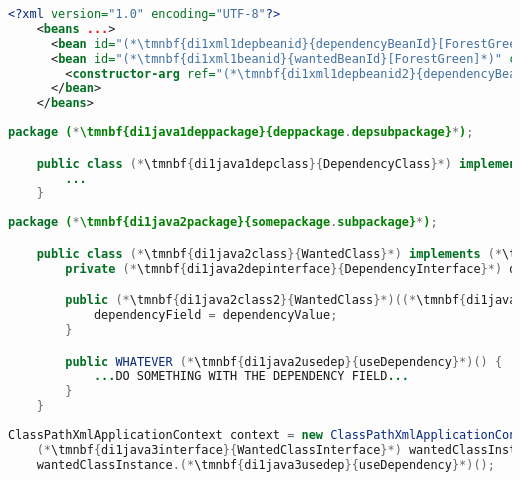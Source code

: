 \begin{lstlisting}[language=XML, title={Configuration XML}]
    <?xml version="1.0" encoding="UTF-8"?>
    <beans ...>
      <bean id="(*\tmnbf{di1xml1depbeanid}{dependencyBeanId}[ForestGreen]*)" class="(*\tmnbf{di1xml1deppackage}{deppackage.depsubpackage}[ForestGreen]*).(*\tmnbf{di1xml1depclass}{DependencyClass}[ForestGreen]*)"/>
      <bean id="(*\tmnbf{di1xml1beanid}{wantedBeanId}[ForestGreen]*)" class="(*\tmnbf{di1xml1package}{somepackage.subpackage}[ForestGreen]*).(*\tmnbf{di1xml1class}{WantedClass}[ForestGreen]*)">
        <constructor-arg ref="(*\tmnbf{di1xml1depbeanid2}{dependencyBeanId}[ForestGreen]*)"/>
      </bean>
    </beans>
\end{lstlisting}
\begin{lstlisting}[language=Java, title={Dependency class}]
    package (*\tmnbf{di1java1deppackage}{deppackage.depsubpackage}*);

    public class (*\tmnbf{di1java1depclass}{DependencyClass}*) implements (*\tmnbf{di1java1depinterface}{DependencyInterface}*) {
        ...
    }
\end{lstlisting}
\begin{lstlisting}[language=Java, title={Wanted class with the constructor}]
    package (*\tmnbf{di1java2package}{somepackage.subpackage}*);

    public class (*\tmnbf{di1java2class}{WantedClass}*) implements (*\tmnbf{di1java2interface}{WantedClassInterface}*) {
        private (*\tmnbf{di1java2depinterface}{DependencyInterface}*) dependencyField;

        public (*\tmnbf{di1java2class2}{WantedClass}*)((*\tmnbf{di1java2depinterface2}{DependencyInterface}*) dependencyValue) {
            dependencyField = dependencyValue;
        }

        public WHATEVER (*\tmnbf{di1java2usedep}{useDependency}*)() {
            ...DO SOMETHING WITH THE DEPENDENCY FIELD...
        }
    }
\end{lstlisting}
\begin{lstlisting}[language=Java, title={Usage}]
    ClassPathXmlApplicationContext context = new ClassPathXmlApplicationContext("configurationFile.xml");
    (*\tmnbf{di1java3interface}{WantedClassInterface}*) wantedClassInstance = context.getBean("(*\tmnbf{di1java3beanid}{wantedBeanId}[ForestGreen]*)", (*\tmnbf{di1java3interface2}{WantedClassInterface}*).class);
    wantedClassInstance.(*\tmnbf{di1java3usedep}{useDependency}*)();
\end{lstlisting}
